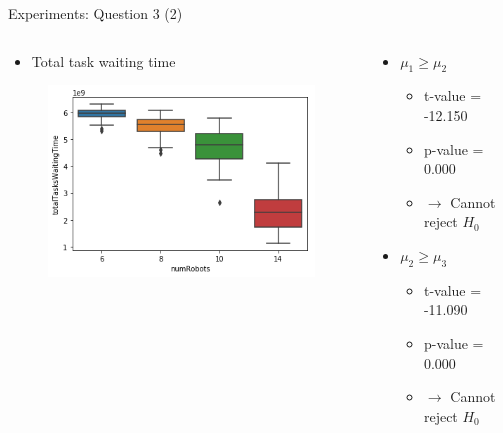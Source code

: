 \begin{frame}{Experiments: Question 3 (2)}
    \begin{columns}

        \begin{column}{0.5\textwidth}
            \begin{itemize}
                \item Total task waiting time
            \end{itemize}

            \begin{figure}[hbt]
                \includegraphics[width=1.1\textwidth]{imgs/question3-plot1}
            \end{figure}
        \end{column}

        \begin{column}{0.5\textwidth}
            \begin{itemize}
                \item $\mu_1 \geq \mu_2$
                    \begin{itemize}
                        \item t-value = -12.150
                        \item p-value = 0.000
                        \item $\rightarrow$ Cannot reject $H_0$
                    \end{itemize}

                \item $\mu_2 \geq \mu_3$
                    \begin{itemize}
                        \item t-value = -11.090
                        \item p-value = 0.000
                        \item $\rightarrow$ Cannot reject $H_0$
                    \end{itemize}


\end{itemize}
\end{column}
\end{columns}
\end{frame}
